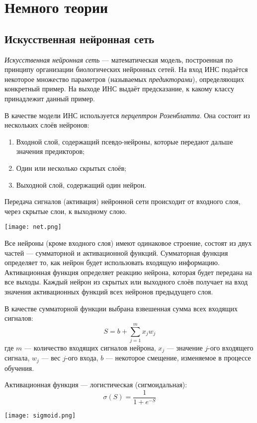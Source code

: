 \section{Немного теории}
\subsection{Искусственная нейронная сеть}

	\textit{Искусственная нейронная сеть} --- математическая модель, построенная по принципу организации биологических нейронных сетей.
	На вход ИНС подаётся некоторое множество параметров (называемых \textit{предикторами}), определяющих конкретный пример.
	На выходе ИНС выдаёт предсказание, к какому классу принадлежит данный пример.

	В качестве модели ИНС используется \textit{перцептрон Розенблатта}.
	Она состоит из нескольких слоёв нейронов:
	\begin{enumerate}
		\item Входной слой, содержащий псевдо-нейроны, которые передают дальше значения предикторов;
		\item Один или несколько скрытых слоёв;
		\item Выходной слой, содержащий один нейрон.
	\end{enumerate}
	Передача сигналов (активация) нейронной сети происходит от входного слоя, через скрытые слои, к выходному слою.

	\texttt{[image: net.png]}

	Все нейроны (кроме входного слоя) имеют одинаковое строение, состоят из двух частей --- сумматорной и активационной функций.
	Сумматорная функция определяет то, как нейрон будет использовать входящую информацию.
	Активационная функция определяет реакцию нейрона, которая будет передана на все выходы.
	Каждый нейрон из скрытых или выходного слоёв получает на вход значения активационных функций всех нейронов предыдущего слоя.

	В качестве сумматорной функции выбрана взвешенная сумма всех входящих сигналов:
	\[
		S = b + \sum_{j = 1}^m x_j w_j
	\]
	где $m$ --- количество входящих сигналов нейрона, $x_j$ --- значение $j$-ого входящего сигнала, $w_j$ --- вес $j$-ого входа,
	$b$ --- некоторое смещение, изменяемое в процессе обучения.

	Активационная функция --- логистическая (сигмоидальная):
	\[
		\sigma\left(S\right) = \frac{1}{1 + e^{-S}}
	\]

	\texttt{[image: sigmoid.png]}

